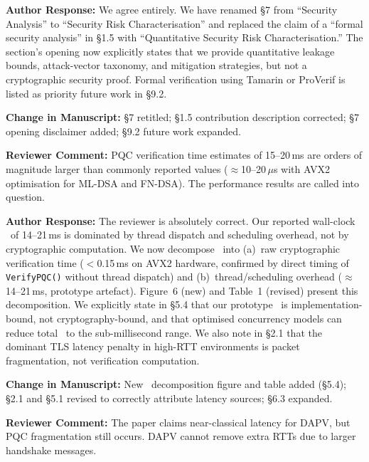 \documentclass[12pt]{article}
\newcommand{\RC}[1]{\textcolor{reviewerblue}{\textbf{Reviewer Comment:}} #1}
\newcommand{\AR}[1]{\textcolor{replygreen}{\textbf{Author Response:}} #1}
\newcommand{\CH}[1]{\textcolor{changemagenta}{\textbf{Change in Manuscript:}} #1}
\begin{document}
\begin{replybox}
\AR{We agree entirely.  We have renamed \S7 from ``Security Analysis'' to
``Security Risk Characterisation'' and replaced the claim of a ``formal
security analysis'' in \S1.5 with ``Quantitative Security Risk
Characterisation.''  The section's opening now explicitly states that we
provide quantitative leakage bounds, attack-vector taxonomy, and mitigation
strategies, but not a cryptographic security proof.  Formal verification
using Tamarin or ProVerif is listed as priority future work in \S9.2.}

\CH{\S7 retitled; \S1.5 contribution description corrected; \S7 opening
disclaimer added; \S9.2 future work expanded.}
\end{replybox}

\begin{reviewbox}
\RC{PQC verification time estimates of 15--20\,ms are orders of magnitude
larger than commonly reported values ($\approx$10--20\,$\mu$s with AVX2
optimisation for ML-DSA and FN-DSA).  The performance results are called
into question.}
\end{reviewbox}

\begin{replybox}
\AR{The reviewer is absolutely correct.  Our reported wall-clock \Dt\ of
14--21\,ms is dominated by thread dispatch and scheduling overhead, not by
cryptographic computation.  We now decompose \Dt\ into (a)~raw
cryptographic verification time ($<$0.15\,ms on AVX2 hardware, confirmed
by direct timing of \texttt{VerifyPQC()} without thread dispatch) and
(b)~thread/scheduling overhead ($\approx$14--21\,ms, prototype artefact).
Figure~6 (new) and Table~1 (revised) present this decomposition.
We explicitly state in \S5.4 that our prototype \Dt\ is implementation-bound,
not cryptography-bound, and that optimised concurrency models can reduce
total \Dt\ to the sub-millisecond range.  We also note in \S2.1 that
the dominant TLS latency penalty in high-RTT environments is packet
fragmentation, not verification computation.}

\CH{New \Dt\ decomposition figure and table added (\S5.4); \S2.1 and \S5.1
revised to correctly attribute latency sources; \S6.3 expanded.}
\end{replybox}

\begin{reviewbox}
\RC{The paper claims near-classical latency for DAPV, but PQC fragmentation
still occurs.  DAPV cannot remove extra RTTs due to larger handshake messages.}
\end{reviewbox}
\end{document}
